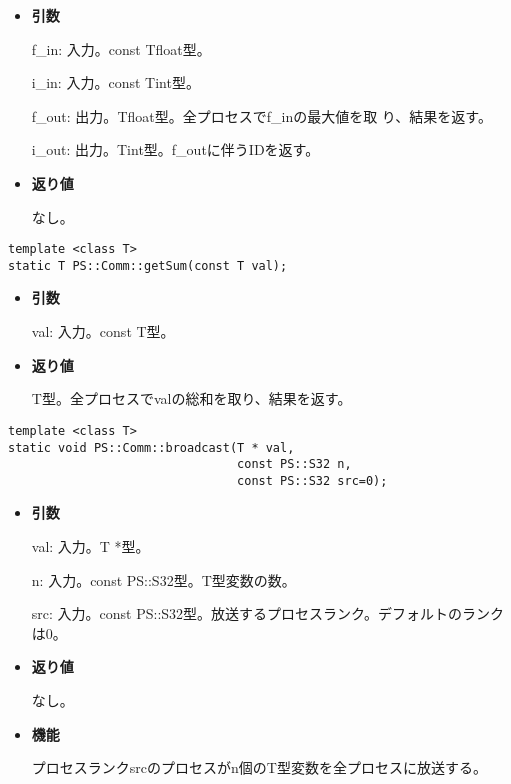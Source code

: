 \begin{itemize}

\item{{\bf 引数}}

f\_in: 入力。const Tfloat型。

i\_in: 入力。{const Tint}型。

{f\_out}: 出力。{Tfloat}型。全プロセスで{f\_in}の最大値を取
り、結果を返す。

{i\_out}: 出力。{Tint}型。{f\_out}に伴うIDを返す。

\item{{\bf 返り値}}

なし。

\end{itemize}


\begin{screen}
\begin{verbatim}
template <class T>
static T PS::Comm::getSum(const T val);
\end{verbatim}
\end{screen}

\begin{itemize}

\item{{\bf 引数}}

{val}: 入力。{const T}型。

\item{{\bf 返り値}}

{T}型。全プロセスで{val}の総和を取り、結果を返す。

\end{itemize}


\begin{screen}
\begin{verbatim}
template <class T>
static void PS::Comm::broadcast(T * val,
                                const PS::S32 n,
                                const PS::S32 src=0);
\end{verbatim}
\end{screen}

\begin{itemize}

\item{{\bf 引数}}

val: 入力。T *型。

n: 入力。const PS::S32型。T型変数の数。

src: 入力。const PS::S32型。放送するプロセスランク。デフォルトのランク
は0。

\item{{\bf 返り値}}

なし。

\item{{\bf 機能}}

プロセスランクsrcのプロセスがn個のT型変数を全プロセスに放送する。

\end{itemize}
